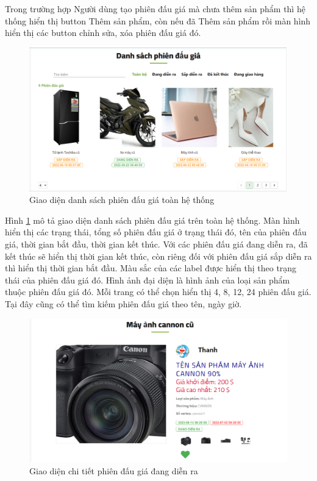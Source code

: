 \documentclass[../DoAn.tex]{subfiles}
\begin{document}
Trong trường hợp Người dùng tạo phiên đấu giá mà chưa thêm sản phẩm thì hệ thống hiển thị button Thêm sản phẩm, còn nếu đã Thêm sản phẩm rồi màn hình hiển thị các button chỉnh sửa, xóa phiên đấu giá đó. 
\begin{figure}[H]
    \centering
    \includegraphics[width=0.75\linewidth,height=6.24cm]{Hinhve/listauctions.png}
    \caption{Giao diện danh sách phiên đấu giá toàn hệ thống}
    \label{fig:Fig417}
\end{figure}
Hình \ref{fig:Fig417} mô tả giao diện danh sách phiên đấu giá trên toàn hệ thống. Màn hình hiển thị các trạng thái, tổng số phiên đấu giá ở trạng thái đó, tên của phiên đấu giá, thời gian bắt đầu, thời gian kết thúc. Với các phiên đấu giá đang diễn ra, đã kết thúc sẽ hiển thị thời gian kết thúc, còn riêng đối với phiên đấu giá sắp diễn ra thì hiển thị thời gian bắt đầu. Màu sắc của các label được hiển thị theo trạng thái của phiên đấu giá đó. Hình ảnh đại diện là hình ảnh của loại sản phẩm thuộc phiên đấu giá đó. Mỗi trang có thể chọn hiển thị 4, 8, 12, 24 phiên đấu giá. Tại đây cũng có thể tìm kiếm phiên đấu giá theo tên, ngày giờ. 
\begin{figure}[H]
    \centering
    \includegraphics[width=0.75\linewidth,height=6.24cm]{Hinhve/auctionactive.png}
    \caption{Giao diện chi tiết phiên đấu giá đang diễn ra}
    \label{fig:Fig418}
\end{figure}
\end{document}
